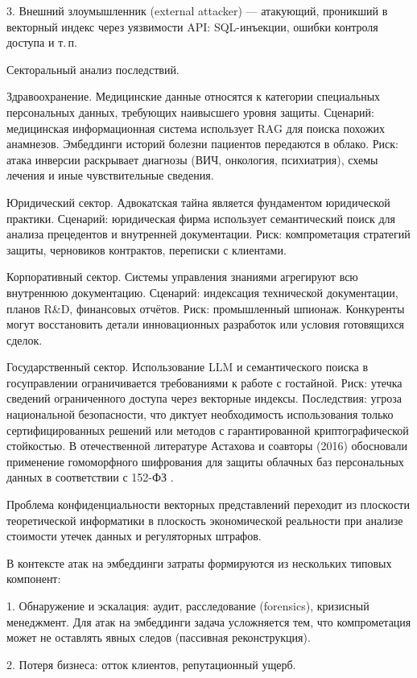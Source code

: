 \documentclass[a4paper, 12pt, oneside, openany]{article}
\begin{document}
3. Внешний злоумышленник (external attacker) — атакующий, проникший в векторный индекс через уязвимости API: SQL-инъекции, ошибки контроля доступа и т.\,п.


Секторальный анализ последствий.

Здравоохранение. Медицинские данные относятся к категории специальных персональных данных, требующих наивысшего уровня защиты. Сценарий: медицинская информационная система использует RAG для поиска похожих анамнезов. Эмбеддинги историй болезни пациентов передаются в облако. Риск: атака инверсии раскрывает диагнозы (ВИЧ, онкология, психиатрия), схемы лечения и иные чувствительные сведения.

Юридический сектор. Адвокатская тайна является фундаментом юридической практики. Сценарий: юридическая фирма использует семантический поиск для анализа прецедентов и внутренней документации. Риск: компрометация стратегий защиты, черновиков контрактов, переписки с клиентами.

Корпоративный сектор. Системы управления знаниями агрегируют всю внутреннюю документацию. Сценарий: индексация технической документации, планов R\&D, финансовых отчётов. Риск: промышленный шпионаж. Конкуренты могут восстановить детали инновационных разработок или условия готовящихся сделок.

Государственный сектор. Использование LLM и семантического поиска в госуправлении ограничивается требованиями к работе с гостайной. Риск: утечка сведений ограниченного доступа через векторные индексы. Последствия: угроза национальной безопасности, что диктует необходимость использования только сертифицированных решений или методов с гарантированной криптографической стойкостью. В отечественной литературе Астахова и соавторы (2016) обосновали применение гомоморфного шифрования для защиты облачных баз персональных данных в соответствии с 152-ФЗ \cite{ref62}.

Проблема конфиденциальности векторных представлений переходит из плоскости теоретической информатики в плоскость экономической реальности при анализе стоимости утечек данных и регуляторных штрафов.

В контексте атак на эмбеддинги затраты формируются из нескольких типовых компонент:

1. Обнаружение и эскалация: аудит, расследование (forensics), кризисный менеджмент. Для атак на эмбеддинги задача усложняется тем, что компрометация может не оставлять явных следов (пассивная реконструкция).

2. Потеря бизнеса: отток клиентов, репутационный ущерб.
\end{document}
